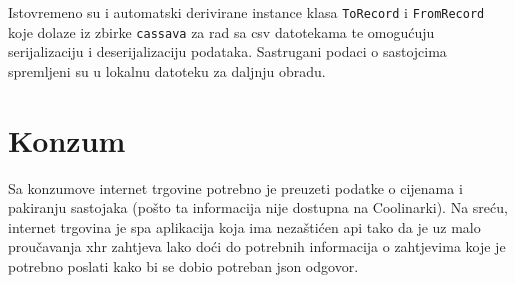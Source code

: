 
Istovremeno su i automatski derivirane instance klasa \texttt{ToRecord} i \texttt{FromRecord} koje dolaze iz zbirke \texttt{cassava} za rad sa \acs{csv} datotekama te omogućuju serijalizaciju i deserijalizaciju podataka. Sastrugani podaci o sastojcima spremljeni su u lokalnu datoteku za daljnju obradu.

\section{Konzum}

Sa konzumove internet trgovine potrebno je preuzeti podatke o cijenama i pakiranju sastojaka (pošto ta informacija nije dostupna na Coolinarki). Na sreću, internet trgovina je \acs{spa} aplikacija koja ima nezaštićen \acs{api} tako da je uz malo proučavanja \acs{xhr} zahtjeva lako doći do potrebnih informacija o zahtjevima koje je potrebno poslati kako bi se dobio potreban \acs{json} odgovor.